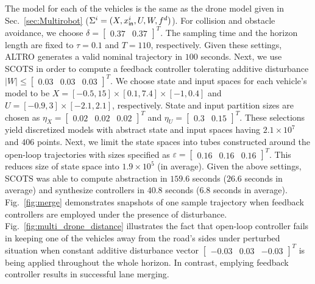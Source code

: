 The model for each of the vehicles is the same as the drone model given in Sec.~\ref{sec:Multirobot} ($\Sigma^i=(X,x_{\mathsf{in}}^i,U,W,f^d)$). For collision and obstacle avoidance, we choose $\delta=\begin{bmatrix}0.37&0.37\end{bmatrix}^T$. The sampling time and the horizon length are fixed to $\tau=0.1$ and $T=110$, respectively. Given these settings, ALTRO generates a valid nominal trajectory in $100$ seconds. Next, we use SCOTS in order to compute a feedback controller tolerating additive disturbance $|W|\leq\begin{bmatrix}0.03&0.03&0.03\end{bmatrix}^T$. We choose state and input spaces for each vehicle's model to be $X=[-0.5,15]\times[0.1,7.4]\times[-1,0.4]$ and $U=[-0.9,3]\times[-2.1,2.1]$, respectively. State and input partition sizes are chosen as $\eta_{X}=\begin{bmatrix}0.02&0.02&0.02\end{bmatrix}^T$ and $\eta_{U}=\begin{bmatrix}0.3&0.15\end{bmatrix}^T$. These selections yield discretized models with abstract state and input spaces having $2.1\times 10^7$ and $406$ points. Next, we limit the state spaces into tubes constructed around the open-loop trajectories with sizes specified as $\varepsilon=\begin{bmatrix}0.16&0.16&0.16\end{bmatrix}^T$. This reduces size of state space into $1.9\times 10^5$ (in average). Given the above settings, SCOTS was able to compute abstraction in $159.6$ seconds ($26.6$ seconds in average) and synthesize controllers in $40.8$ seconds ($6.8$ seconds in average). Fig.~\ref{fig:merge} demonstrates snapshots of one sample trajectory when feedback controllers are employed under the presence of disturbance. Fig.~\ref{fig:multi_drone_distance} illustrates the fact that open-loop controller fails in keeping one of the vehicles away from the road's sides under perturbed situation when constant additive disturbance vector $\begin{bmatrix}-0.03 &0.03&-0.03\end{bmatrix}^T$ is being applied throughout the whole horizon. In contrast, emplying feedback controller results in successful lane merging. 